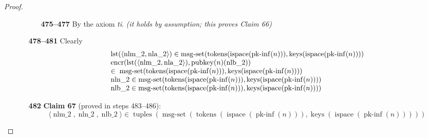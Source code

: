 \documentclass[11pt]{article}
\theoremstyle{plain}
\begin{document}
\begin{proof}
\begin{itemize}[leftmargin=2.8em, itemsep=4pt, parsep=1pt]
\begin{itemize}[leftmargin=2.8em, itemsep=4pt, parsep=1pt]
  \begin{itemize}[leftmargin=2.8em, itemsep=4pt, parsep=1pt]
  \item[\textbf{475--477}] By the axiom \emph{ti}.  \emph{(it holds by assumption; this proves Claim 66)}
  \end{itemize}
  \item[\textbf{478--481}] Clearly
\begin{equation*}
\begin{array}{@{}l@{}}
\operatorname{lst}(\langle \operatorname{nlm\_2}, \operatorname{nla\_2} \rangle) \in \operatorname{msg\text{-}set}(\operatorname{tokens}(\operatorname{ispace}(\operatorname{pk\text{-}inf}(n))), \operatorname{keys}(\operatorname{ispace}(\operatorname{pk\text{-}inf}(n)))) \\
\begin{array}{@{}l@{}} \operatorname{encr}(\operatorname{lst}(\langle \operatorname{nlm\_2}, \operatorname{nla\_2} \rangle), \operatorname{pubkey}(n)(\operatorname{nlb\_2})) \\ \in\; \operatorname{msg\text{-}set}(\operatorname{tokens}(\operatorname{ispace}(\operatorname{pk\text{-}inf}(n))), \operatorname{keys}(\operatorname{ispace}(\operatorname{pk\text{-}inf}(n)))) \end{array} \\
\operatorname{nln\_2} \in \operatorname{msg\text{-}set}(\operatorname{tokens}(\operatorname{ispace}(\operatorname{pk\text{-}inf}(n))), \operatorname{keys}(\operatorname{ispace}(\operatorname{pk\text{-}inf}(n)))) \\
\operatorname{nlb\_2} \in \operatorname{msg\text{-}set}(\operatorname{tokens}(\operatorname{ispace}(\operatorname{pk\text{-}inf}(n))), \operatorname{keys}(\operatorname{ispace}(\operatorname{pk\text{-}inf}(n))))
\end{array}
\end{equation*}

  \item[\textbf{482}] \textbf{Claim 67} (proved in steps 483--486):
\begin{equation*}
\langle \operatorname{nlm\_2}, \operatorname{nln\_2}, \operatorname{nlb\_2} \rangle \in \operatorname{tuples}(\operatorname{msg\text{-}set}(\operatorname{tokens}(\operatorname{ispace}(\operatorname{pk\text{-}inf}(n))), \operatorname{keys}(\operatorname{ispace}(\operatorname{pk\text{-}inf}(n)))))
\end{equation*}


\end{itemize}
\end{itemize}
\end{proof}
\end{document}
